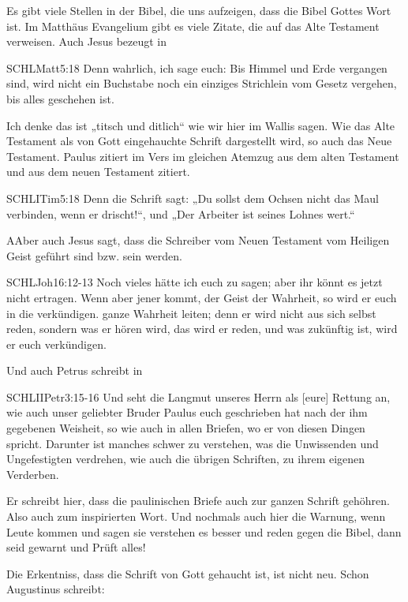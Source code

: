 Es gibt viele Stellen in der Bibel, die uns aufzeigen, dass die Bibel Gottes Wort ist. Im Matthäus Evangelium gibt es viele Zitate, die auf das Alte Testament verweisen. Auch Jesus bezeugt in 
\begin{bibelbox}{SCHL}{Matt}{5:18}
Denn wahrlich, ich sage euch: Bis Himmel und Erde vergangen sind, wird nicht ein Buchstabe noch ein einziges Strichlein vom Gesetz vergehen, bis alles geschehen ist.
\end{bibelbox}
Ich denke das ist „titsch und ditlich“ wie wir hier im Wallis sagen. Wie das Alte Testament als von Gott eingehauchte Schrift dargestellt wird, so auch das Neue Testament. Paulus zitiert im Vers  im gleichen Atemzug aus dem alten Testament  und aus dem neuen Testament  zitiert.
\begin{bibelbox}{SCHL}{ITim}{5:18}
Denn die Schrift sagt: „Du sollst dem Ochsen nicht das Maul verbinden, wenn er drischt!“, und „Der Arbeiter ist seines Lohnes wert.“
\end{bibelbox}
AAber auch Jesus sagt, dass die Schreiber vom Neuen Testament vom Heiligen Geist geführt sind bzw. sein werden.
\begin{bibelbox}{SCHL}{Joh}{16:12-13}
Noch vieles hätte ich euch zu sagen; aber ihr könnt es jetzt nicht ertragen. Wenn aber jener kommt, der Geist der Wahrheit, so wird er euch in die verkündigen. ganze Wahrheit leiten; denn er wird nicht aus sich selbst reden, sondern was er hören wird, das wird er reden, und was zukünftig ist, wird er euch verkündigen.
\end{bibelbox}

Und auch Petrus schreibt in
\begin{bibelbox}{SCHL}{IIPetr}{3:15-16}
Und seht die Langmut unseres Herrn als [eure] Rettung an, wie auch unser geliebter Bruder Paulus euch geschrieben hat nach der ihm gegebenen Weisheit, so wie auch in allen Briefen, wo er von diesen Dingen spricht. Darunter ist manches schwer zu verstehen, was die Unwissenden und Ungefestigten verdrehen, wie auch die übrigen Schriften, zu ihrem eigenen Verderben.
\end{bibelbox}
Er schreibt hier, dass die paulinischen Briefe auch zur ganzen Schrift gehöhren. Also auch zum inspirierten Wort. Und nochmals auch hier die Warnung, wenn Leute kommen und sagen sie verstehen es besser und reden gegen die Bibel, dann seid gewarnt und Prüft alles!

Die Erkentniss, dass die Schrift von Gott gehaucht ist, ist nicht neu. Schon Augustinus schreibt:

